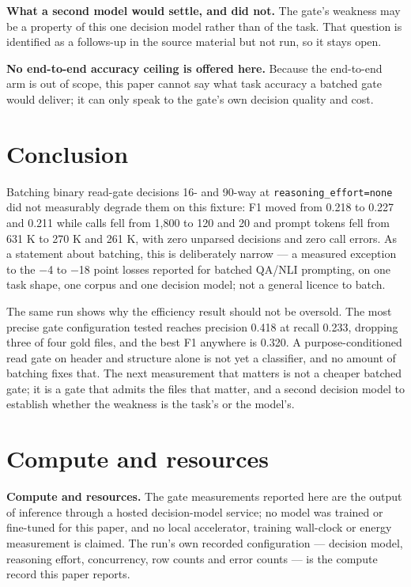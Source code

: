 \documentclass[10pt]{article}
\begin{document}
\textbf{What a second model would settle, and did not.} The gate's weakness may be a property of this one decision model rather than of the task. That question is identified as a follows-up in the source material but not run, so it stays open.

\textbf{No end-to-end accuracy ceiling is offered here.} Because the end-to-end arm is out of scope, this paper cannot say what task accuracy a batched gate would deliver; it can only speak to the gate's own decision quality and cost.

\section{Conclusion}

Batching binary read-gate decisions 16- and 90-way at \texttt{reasoning\_effort=none} did not measurably degrade them on this fixture: F1 moved from 0.218 to 0.227 and 0.211 while calls fell from 1,800 to 120 and 20 and prompt tokens fell from 631 K to 270 K and 261 K, with zero unparsed decisions and zero call errors. As a statement about batching, this is deliberately narrow --- a measured exception to the $-$4 to $-$18 point losses reported for batched QA/NLI prompting, on one task shape, one corpus and one decision model; not a general licence to batch.

The same run shows why the efficiency result should not be oversold. The most precise gate configuration tested reaches precision 0.418 at recall 0.233, dropping three of four gold files, and the best F1 anywhere is 0.320. A purpose-conditioned read gate on header and structure alone is not yet a classifier, and no amount of batching fixes that. The next measurement that matters is not a cheaper batched gate; it is a gate that admits the files that matter, and a second decision model to establish whether the weakness is the task's or the model's.

\section*{Compute and resources}

\textbf{Compute and resources.} The gate measurements reported here are the output of inference through a hosted decision-model service; no model was trained or fine-tuned for this paper, and no local accelerator, training wall-clock or energy measurement is claimed. The run's own recorded configuration --- decision model, reasoning effort, concurrency, row counts and error counts --- is the compute record this paper reports.
\end{document}
